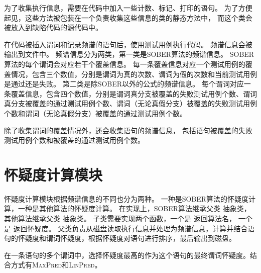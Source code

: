 为了收集执行信息，需要在代码中加入一些计数、标记、打印的语句。
为了方便起见，这些方法被包装在一个负责收集这些信息的类的静态方法中，
而这个类会被放入到缺陷代码的源代码中。

在代码被插入谓词和记录频谱的语句后，使用测试用例执行代码。
频谱信息会被输出到文件中。
频谱信息分为两类，第一类是SOBER算法的频谱信息。
SOBER算法的每个谓词会对应若干个覆盖信息。
每一条覆盖信息对应一个测试用例的覆盖情况，包含三个数值，分别是谓词为真的次数、谓词为假的次数和当前测试用例是通过还是失败。
第二类是除SOBER以外的公式的频谱信息。
每个谓词对应一条覆盖信息，包含四个数值，分别是谓词真分支被覆盖的失败测试用例个数、谓词真分支被覆盖的通过测试用例个数、谓词（无论真假分支）被覆盖的失败测试用例个数和谓词（无论真假分支）被覆盖的通过测试用例个数。

除了收集谓词的覆盖情况外，还会收集语句的频谱信息，
包括语句被覆盖的失败测试用例个数和被覆盖的通过测试用例个数。

\section{怀疑度计算模块}

怀疑度计算模块根据频谱信息的不同也分为两种。
一种是SOBER算法的怀疑度计算，一种是其他算法的怀疑度计算。
在实现上，SOBER算法继承父类  抽象类，
其他算法继承父类  抽象类。
子类需要实现两个函数，一个是  返回算法名，
一个是  返回怀疑度。
父类负责从磁盘读取执行信息并处理为频谱信息，计算并结合语句的怀疑度和谓词怀疑度，根据怀疑度对语句进行排序，最后输出到磁盘。

在一条语句的多个谓词中，选择怀疑度最高的作为这个语句的最终谓词怀疑度。结合方式有\textsc{MaxPred}和\textsc{LinPred}。


